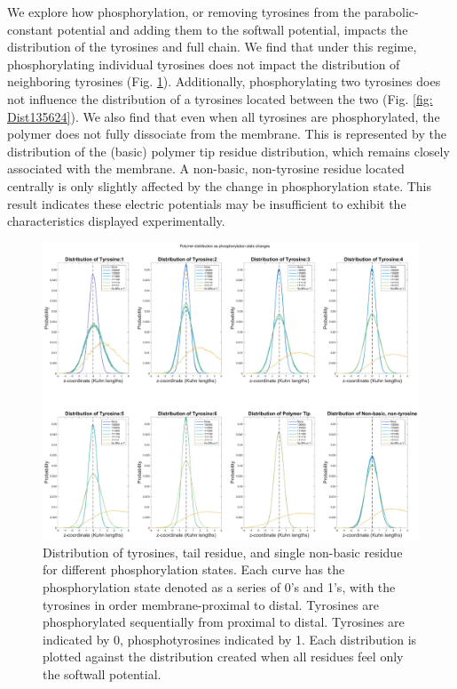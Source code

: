 \documentclass[../../AdvancementSummary.tex]{subfiles}
\begin{document}
We explore how phosphorylation, or removing tyrosines from the parabolic-constant potential and adding them to the softwall potential, impacts the distribution of the tyrosines and full chain. We find that under this regime, phosphorylating individual tyrosines does not impact the distribution of neighboring tyrosines (Fig. \ref{fig: Dist123456}). Additionally, phosphorylating two tyrosines does not influence the distribution of a tyrosines located between the two (Fig. \ref{fig: Dist135624}). We also find that even when all tyrosines are phosphorylated, the polymer does not fully dissociate from the membrane. This is represented by the distribution of the (basic) polymer tip residue distribution, which remains closely associated with the membrane. A non-basic, non-tyrosine residue located centrally is only slightly affected by the change in phosphorylation state. This result indicates these electric potentials may be insufficient to exhibit the characteristics displayed experimentally.

\begin{figure}[H]
\begin{center}
\includegraphics[width=\linewidth]{ResultsFigures/CD3ZetaSoftwallPiecewiseBasicsY/Phosphorylation/iSiteDistribution123456.eps}
\end{center}
\caption{Distribution of tyrosines, tail residue, and single non-basic residue for different phosphorylation states. Each curve has the phosphorylation state denoted as a series of 0's and 1's, with the tyrosines in order membrane-proximal to distal. Tyrosines are phosphorylated sequentially from proximal to distal. Tyrosines are indicated by 0, phosphotyrosines indicated by 1. Each distribution is plotted against the distribution created when all residues feel only the softwall potential. \label{fig: Dist123456}}
\end{figure}
\end{document}
